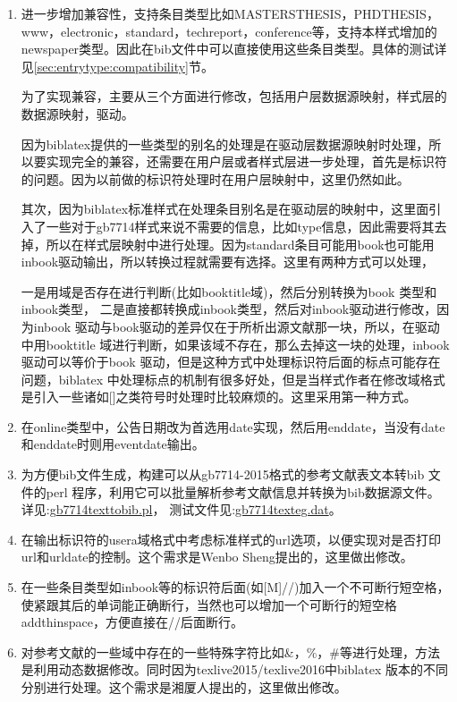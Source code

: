 \label{up:170226}
\begin{enumerate}
\item 进一步增加兼容性，支持条目类型比如MASTERSTHESIS，PHDTHESIS，www，electronic，standard，techreport，conference等，支持本样式增加的newspaper类型。因此在bib文件中可以直接使用这些条目类型。具体的测试详见\ref{sec:entrytype:compatibility}节。

    为了实现兼容，主要从三个方面进行修改，包括用户层数据源映射，样式层的数据源映射，驱动。

    因为biblatex提供的一些类型的别名的处理是在驱动层数据源映射时处理，所以要实现完全的兼容，还需要在用户层或者样式层进一步处理，首先是标识符的问题。因为以前做的标识符处理时在用户层映射中，这里仍然如此。

    其次，因为biblatex标准样式在处理条目别名是在驱动层的映射中，这里面引入了一些对于gb7714样式来说不需要的信息，比如type信息，因此需要将其去掉，所以在样式层映射中进行处理。因为standard条目可能用book也可能用inbook驱动输出，所以转换过程就需要有选择。这里有两种方式可以处理，
    
    一是用域是否存在进行判断(比如booktitle域)，然后分别转换为book 类型和inbook类型，
    二是直接都转换成inbook类型，然后对inbook驱动进行修改，因为inbook 驱动与book驱动的差异仅在于所析出源文献那一块，所以，在驱动中用booktitle 域进行判断，如果该域不存在，那么去掉这一块的处理，inbook驱动可以等价于book 驱动，但是这种方式中处理标识符后面的标点可能存在问题，biblatex 中处理标点的机制有很多好处，但是当样式作者在修改域格式是引入一些诸如[]之类符号时处理时比较麻烦的。这里采用第一种方式。

\item 在online类型中，公告日期改为首选用date实现，然后用enddate，当没有date 和enddate时则用eventdate输出。

\item 为方便bib文件生成，构建可以从gb7714-2015格式的参考文献表文本转bib 文件的perl 程序，利用它可以批量解析参考文献信息并转换为bib数据源文件。详见:\href{run:./gb7714texttobib.pl}{gb7714texttobib.pl}，
    测试文件见:\href{run:./gb7714texteg.dat}{gb7714texteg.dat}。

\item 在输出标识符的usera域格式中考虑标准样式的url选项，以便实现对是否打印url和urldate的控制。这个需求是Wenbo Sheng提出的，这里做出修改。

\item 在一些条目类型如inbook等的标识符后面(如[M]//)加入一个不可断行短空格，使紧跟其后的单词能正确断行，当然也可以增加一个可断行的短空格addthinspace，方便直接在//后面断行。
    \begin{texlist}
    \printtext{\texttt{//}\addnbthinspace}%
    \end{texlist}

\item 对参考文献的一些域中存在的一些特殊字符比如\&，\%，\#等进行处理，方法是利用动态数据修改。同时因为texlive2015/texlive2016中biblatex 版本的不同分别进行处理。这个需求是湘厦人提出的，这里做出修改。


\end{enumerate}

